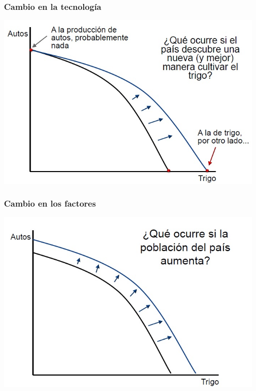 \documentclass{beamer}
\begin{document}
\begin{frame}
\frametitle{Cambio en la tecnología}
\begin{center}
    \includegraphics[scale=0.6]{Slides Principios de Economia/Tema_11.7_cambiotecnologico.jpg}
\end{center}
\end{frame}

\begin{frame}
\frametitle{Cambio en los factores}
\begin{center}
    \includegraphics[scale=0.55]{Slides Principios de Economia/Tema_11.8_cambioenlosfactores.jpg}
\end{center}
\end{frame}
\end{document}
